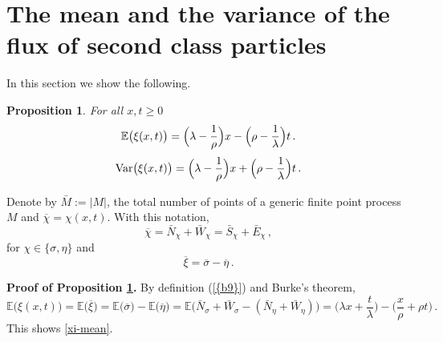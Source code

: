 \documentclass[reqno, 12pt]{amsart}
\newtheorem{proposition}{Proposition}
\begin{document}
\section{The mean and the variance of  the flux of second class particles}
\label{mean&variance}

In this section we show
the following.
\begin{proposition}\label{mean&var}
For all $x,t\geq 0$
\begin{equation}\label{xi-mean}
{{\mathbb E}}\big(\xi(x,t)\big)
=\Bigl(\lambda-\frac{1}{\rho}\Bigr)x - \Bigl(\rho-\frac1\lambda\Bigr)t\,.
\end{equation}
\begin{equation}\label{xi-var}
{{\rm Var}} \big(\xi(x,t)\big)=
\Bigl(\lambda-\frac{1}{\rho}\Bigr)x + \Bigl(\rho-\frac1\lambda\Bigr)t\,.
\end{equation}
\end{proposition}

Denote by $\bar M:=|M|$, the total number of points of a generic finite point
process $M$ and ${{\overline \chi}}= \chi(x,t)$. With this notation,
\begin{equation}\label{flux-1}
  {{\overline \chi}}= {{\bar N}}_\chi+{{\bar W}}_\chi={{\bar S}}_\chi+{{\bar E}}_\chi\,,
\end{equation}
for $\chi\in\{\sigma,\eta\}$ and
\begin{equation}
  \label{b10}
  {{\overline \xi}} = {{\overline \sigma}}-{{\overline \eta}}\,.
\end{equation}

{{\noindent \bf Proof of {Proposition \ref{mean&var}}.}} By definition {(\ref{{b9}})} and Burke's theorem,
\[
{{\mathbb E}}\big(\xi(x,t)\big)
={{\mathbb E}}\big({{\overline \xi}}\big)
={{\mathbb E}}\big({{\overline \sigma}}\big)-{{\mathbb E}}\big({{\overline \eta}}\big)
={{\mathbb E}}\big({{\bar N}}_\sigma+{{\bar W}}_\sigma-
({{\bar N}}_\eta+{{\bar W}}_\eta)\big)
=\big(\lambda x +\frac{t}{\lambda}\big)-\big(\frac{x}{\rho} + \rho t\big)\,.
\]
This shows \eqref{xi-mean}.
\end{document}

